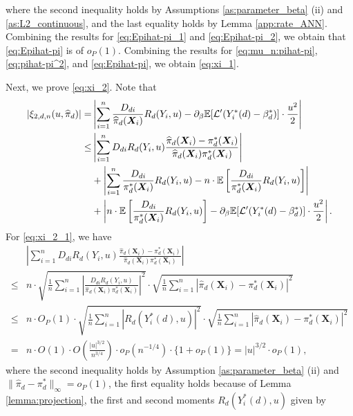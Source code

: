 \documentclass[11pt]{article}
\numberwithin{equation}{section}
\begin{document}
where the second inequality holds by Assumptions \ref{as:parameter_beta} (ii) and \ref{as:L2_continuous}, and the last equality holds by Lemma \ref{app:rate_ANN}. Combining the results for \eqref{eq:Epihat-pi_1} and \eqref{eq:Epihat-pi_2},  we obtain that \eqref{eq:Epihat-pi} is of $o_P(1)$. Combining the results for \eqref{eq:mu_n:pihat-pi}, \eqref{eq:pihat-pi^2}, and \eqref{eq:Epihat-pi}, we obtain  \eqref{eq:xi_1}.


Next, we prove \eqref{eq:xi_2}. Note that
\begin{align}
	|\xi_{2,d,n}(u,\widehat{\pi}_d)|=&\left|	\sum_{i=1}^n\frac{D_{di}}{\widehat{\pi}_d(\boldsymbol{X}_{i})}R_d(Y_i,u)-\partial_{\beta}\mathbb{E}[\mathcal{L}'(Y^*_i(d)-\beta_d^*)]\cdot \frac{u^2}{2}\right| \notag\\
	\leq&\left|	\sum_{i=1}^nD_{di}R_d(Y_i,u)\frac{\widehat{\pi}_d(\boldsymbol{X}_{i})-\pi^*_d(\boldsymbol{X}_{i})}{\widehat{\pi}_d(\boldsymbol{X}_{i})\pi^*_d(\boldsymbol{X}_{i})}\right| \label{eq:xi_2_1} \\
	& +\left|	\sum_{i=1}^n\frac{D_{di}}{{\pi}^*_d(\boldsymbol{X}_{i})}R_d(Y_i,u)-n\cdot\mathbb{E}\left[\frac{D_{di}}{{\pi}^*_d(\boldsymbol{X}_{i})}R_d(Y_i,u)\right] \right| \label{eq:xi_2_2}\\
	&+\left|n\cdot\mathbb{E}\left[\frac{D_{di}}{{\pi}^*_d(\boldsymbol{X}_{i})}R_d(Y_i,u)\right]-\partial_{\beta}\mathbb{E}[\mathcal{L}'(Y^*_i(d)-\beta_d^*)]\cdot \frac{u^2}{2} \right| \label{eq:xi_2_3}.
\end{align}
For \eqref{eq:xi_2_1}, we have
\begin{align*}
	&\left|	\sum_{i=1}^nD_{di}R_d(Y_i,u)\frac{\widehat{\pi}_d(\boldsymbol{X}_{i})-\pi^*_d(\boldsymbol{X}_{i})}{\widehat{\pi}_d(\boldsymbol{X}_{i})\pi^*_d(\boldsymbol{X}_{i})}\right|\\
	\leq &n\cdot		\sqrt{\frac{1}{n}\sum_{i=1}^n\left|\frac{D_{di}R_d(Y_i,u)}{\widehat{\pi}_d(\boldsymbol{X}_{i})\pi^*_d(\boldsymbol{X}_{i})}\right|^2}\cdot \sqrt{\frac{1}{n}\sum_{i=1}^n\left|\widehat{\pi}_d(\boldsymbol{X}_{i})-\pi^*_d(\boldsymbol{X}_{i})\right|^2}\\
	\leq &n\cdot	O_P(1) \cdot 	\sqrt{\frac{1}{n}\sum_{i=1}^n\left|R_d(Y^*_i(d),u)\right|^2}\cdot \sqrt{\frac{1}{n}\sum_{i=1}^n\left|\widehat{\pi}_d(\boldsymbol{X}_{i})-\pi^*_d(\boldsymbol{X}_{i})\right|^2}\\
	=&n\cdot O(1)\cdot O\left(\frac{|u|^{3/2}}{n^{3/4}}\right)\cdot o_P(n^{-1/4})\cdot\{1+o_P(1)\}=|u|^{3/2}\cdot o_P(1),
\end{align*}
where the second inequality holds by Assumption \ref{as:parameter_beta} (ii) and $\|\widehat{\pi}_d-\pi_d^*\|_{\infty}=o_P(1)$, the first equality holds because of Lemma \ref{lemma:projection}, the first and second moments $R_d(Y^*_i(d),u)$ given by
\end{document}
